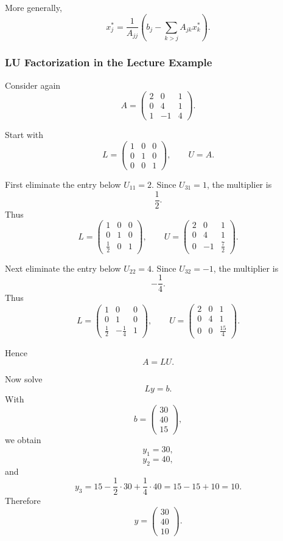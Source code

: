 \documentclass[10pt, letterpaper]{article}
\begin{document}
More generally,
\[
x_j^\ast
=
\frac{1}{A_{jj}}
\left(
b_j-\sum_{k>j}A_{jk}x_k^\ast
\right).
\]

\subsubsection{LU Factorization in the Lecture Example}

Consider again
\[
A=
\begin{pmatrix}
2&0&1\\
0&4&1\\
1&-1&4
\end{pmatrix}.
\]

Start with
\[
L=
\begin{pmatrix}
1&0&0\\
0&1&0\\
0&0&1
\end{pmatrix},
\qquad
U=A.
\]

First eliminate the entry below \(U_{11}=2\). Since \(U_{31}=1\), the multiplier is
\[
\frac{1}{2}.
\]
Thus
\[
L=
\begin{pmatrix}
1&0&0\\
0&1&0\\
\frac12&0&1
\end{pmatrix},
\qquad
U=
\begin{pmatrix}
2&0&1\\
0&4&1\\
0&-1&\frac72
\end{pmatrix}.
\]

Next eliminate the entry below \(U_{22}=4\). Since \(U_{32}=-1\), the multiplier is
\[
-\frac14.
\]
Thus
\[
L=
\begin{pmatrix}
1&0&0\\
0&1&0\\
\frac12&-\frac14&1
\end{pmatrix},
\qquad
U=
\begin{pmatrix}
2&0&1\\
0&4&1\\
0&0&\frac{15}{4}
\end{pmatrix}.
\]

Hence
\[
A=LU.
\]

Now solve
\[
Ly=b.
\]
With
\[
b=
\begin{pmatrix}
30\\
40\\
15
\end{pmatrix},
\]
we obtain
\[
y_1=30,
\]
\[
y_2=40,
\]
and
\[
y_3
=
15-\frac12\cdot 30+\frac14\cdot 40
=
15-15+10
=
10.
\]
Therefore
\[
y=
\begin{pmatrix}
30\\
40\\
10
\end{pmatrix}.
\]
\end{document}
